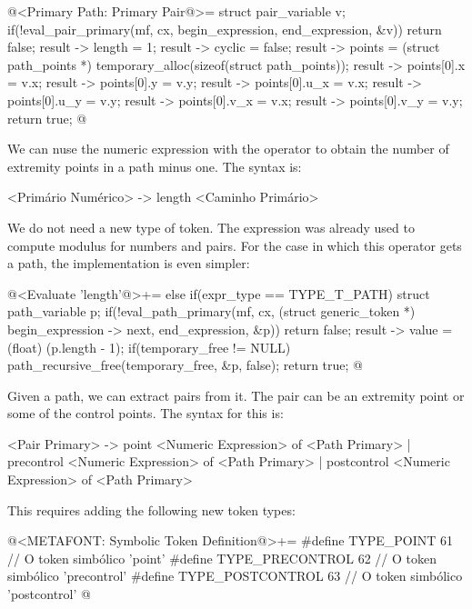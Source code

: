 \iniciocodigo
@<Primary Path: Primary Pair@>=
struct pair_variable v;
if(!eval_pair_primary(mf, cx, begin_expression, end_expression, &v))
  return false;
result -> length = 1;
result -> cyclic = false;
result -> points = (struct path_points *)
                     temporary_alloc(sizeof(struct path_points));
result -> points[0].x = v.x;
result -> points[0].y = v.y;
result -> points[0].u_x = v.x;
result -> points[0].u_y = v.y;
result -> points[0].v_x = v.x;
result -> points[0].v_y = v.y;
return true;
@
\fimcodigo


We can nuse the numeric expression with the
operator  to obtain the number of extremity points
in a path minus one. The syntax is:

\alinhaverbatim
<Primário Numérico> -> length <Caminho Primário>
\alinhanormal

We do not need a new type of token. The expression 
was already used to compute modulus for numbers and pairs. For the
case in which this operator gets a path, the implementation is even
simpler:

\iniciocodigo
@<Evaluate 'length'@>+=
else if(expr_type == TYPE_T_PATH){
  struct path_variable p;
  if(!eval_path_primary(mf, cx, (struct generic_token *)
                                begin_expression -> next, end_expression,
                                &p))
    return false;
  result -> value = (float) (p.length - 1);
  if(temporary_free != NULL)
    path_recursive_free(temporary_free, &p, false);
  return true;
}
@
\fimcodigo


Given a path, we can extract pairs from it. The pair can be an
extremity point or some of the control points. The syntax for this is:

\alinhaverbatim
<Pair Primary> -> point <Numeric Expression> of <Path Primary> |
                     precontrol <Numeric Expression> of <Path Primary> |
                     postcontrol <Numeric Expression> of <Path Primary>
\alinhanormal

This requires adding the following new token types:

\iniciocodigo
@<METAFONT: Symbolic Token Definition@>+=
#define TYPE_POINT             61 // O token simbólico 'point'
#define TYPE_PRECONTROL        62 // O token simbólico 'precontrol'
#define TYPE_POSTCONTROL       63 // O token simbólico 'postcontrol'
@
\fimcodigo

